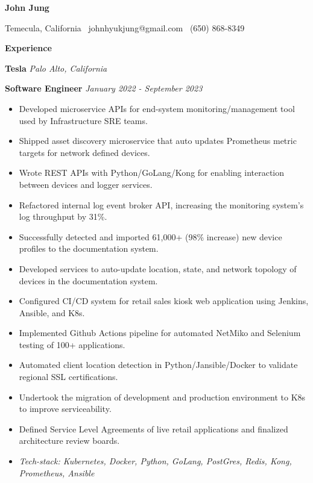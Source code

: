 \documentclass[11pt]{article}
\begin{document}
\begin{center}
    {\huge \textbf{John Jung}}\\ 
\end{center}

\begin{center}
    Temecula, California \textbullet \ johnhyukjung@gmail.com \textbullet \ (650) 868-8349 \\ 
    \hrulefill
\end{center}


\begin{center}
    \textbf{Experience}
\end{center}
\textbf{Tesla} \hfill \textit{Palo Alto, California}

\textbf{Software Engineer} \hfill \textit{January 2022 - September 2023}
\begin{itemize}[noitemsep, topsep=0pt, partopsep=0pt, parsep=0pt]
    \item Developed microservice APIs for end-system monitoring/management tool used by Infrastructure SRE teams.
    \item Shipped asset discovery microservice that auto updates Prometheus metric targets for network defined devices.
    \item Wrote REST APIs with Python/GoLang/Kong for enabling interaction between devices and logger services.
    \item Refactored internal log event broker API, increasing the monitoring system's log throughput by 31\%.
    \item Successfully detected and imported 61,000+ (98\% increase) new device profiles to the documentation system.
    \item Developed services to auto-update location, state, and network topology of devices in the documentation system.
    \item Configured CI/CD system for retail sales kiosk web application using Jenkins, Ansible, and K8s.
    \item Implemented Github Actions pipeline for automated NetMiko and Selenium testing of 100+ applications.
    \item Automated client location detection in Python/Jansible/Docker to validate regional SSL certifications.
    \item Undertook the migration of development and production environment to K8s to improve serviceability.
    \item Defined Service Level Agreements of live retail applications and finalized architecture review boards.
    \item \textit{Tech-stack: Kubernetes, Docker, Python, GoLang, PostGres, Redis, Kong, Prometheus, Ansible}
\end{itemize}
\end{document}
